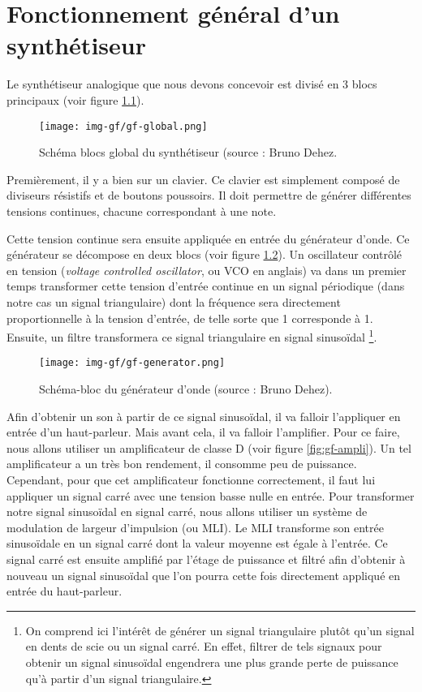 \chapter{Fonctionnement général d'un synthétiseur}
Le synthétiseur analogique que nous devons concevoir
est divisé en 3 blocs principaux (voir figure \ref{fig:gf-global}).

\begin{figure}[ht]
	\centering
	\texttt{[image: img-gf/gf-global.png]}
	\caption{Schéma blocs global du synthétiseur (source : Bruno Dehez.}
	\label{fig:gf-global}
\end{figure}

Premièrement, il y a bien sur un clavier. Ce clavier est simplement
composé de diviseurs résistifs et de boutons poussoirs. Il doit
permettre de générer différentes tensions continues, chacune
correspondant à une note.

Cette tension continue sera ensuite appliquée en entrée du générateur
d'onde. Ce générateur se décompose en deux blocs (voir figure
\ref{fig:gf-generator}). Un oscillateur contrôlé en tension 
(\textit{voltage controlled oscillator}, ou VCO en anglais) va dans
un premier temps transformer cette tension d'entrée continue
en un signal périodique (dans notre cas un signal triangulaire) 
dont la fréquence sera directement proportionnelle
à la tension d'entrée, de telle sorte que
\unit{1}{\milli\volt} corresponde à \unit{1}{\hertz}. Ensuite, un filtre
transformera ce signal triangulaire en signal sinusoïdal
\footnote{On comprend ici l'intérêt de générer un signal triangulaire plutôt
qu'un signal en dents de scie ou un signal carré. En effet, filtrer
de tels signaux pour obtenir un signal sinusoïdal engendrera
une plus grande perte de puissance qu'à partir d'un signal
triangulaire.}.

\begin{figure}[ht]
	\centering
	\texttt{[image: img-gf/gf-generator.png]}
	\caption{Schéma-bloc du générateur d'onde (source : Bruno Dehez).}
	\label{fig:gf-generator}
\end{figure}

Afin d'obtenir un son à partir de ce signal sinusoïdal, il
va falloir l'appliquer en entrée d'un haut-parleur. Mais avant
cela, il va falloir l'amplifier. Pour ce faire, nous allons
utiliser un amplificateur de classe D (voir figure
\ref{fig:gf-ampli}). Un tel amplificateur
a un très bon rendement, il consomme peu de puissance. Cependant,
pour que cet amplificateur fonctionne correctement, il faut
lui appliquer un signal carré avec une tension basse nulle en entrée. Pour transformer
notre signal sinusoïdal en signal carré, nous allons utiliser un
système de modulation de largeur d'impulsion (ou MLI). Le MLI
transforme son entrée sinusoïdale en un signal carré dont la
valeur moyenne est égale à l'entrée. Ce
signal carré est ensuite amplifié par l'étage de puissance
et filtré afin d'obtenir à nouveau un signal sinusoïdal que
l'on pourra cette fois directement appliqué en entrée du haut-parleur.

